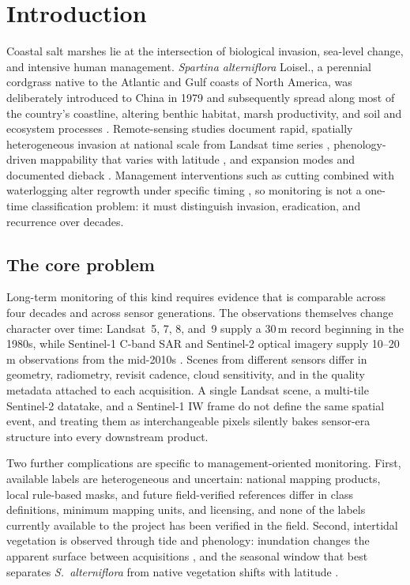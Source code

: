 \section{Introduction}\label{sec:intro}

Coastal salt marshes lie at the intersection of biological invasion,
sea-level change, and intensive human management. \emph{Spartina
alterniflora} Loisel., a perennial cordgrass native to the Atlantic and
Gulf coasts of North America, was deliberately introduced to China in
1979 and subsequently spread along most of the country's coastline,
altering benthic habitat, marsh productivity, and soil and ecosystem
processes
\citep{wang2018soilcarbon,zheng2018productivity,wang2010benthic}. Remote-sensing studies
document rapid, spatially heterogeneous invasion at national scale from
Landsat time series \citep{liu2018rapid,mao2019rapid}, phenology-driven
mappability that varies with latitude \citep{zhang2022latitudinal}, and
expansion modes and documented dieback
\citep{yan2023monitoring}. Management interventions such as cutting
combined with waterlogging alter regrowth under specific timing
\citep{yuan2011cutting}, so monitoring is not a one-time classification
problem: it must distinguish invasion, eradication, and recurrence over
decades.

\subsection{The core problem}
Long-term monitoring of this kind requires evidence that is comparable
across four decades and across sensor generations. The observations
themselves change character over time: Landsat~5, 7, 8, and~9 supply a
30\,m record beginning in the 1980s, while Sentinel-1 C-band SAR and
Sentinel-2 optical imagery supply 10--20\,m observations from the
mid-2010s \citep{wulder2012archive,torres2012s1,drusch2012s2}. Scenes
from different sensors differ in geometry, radiometry, revisit
cadence, cloud sensitivity, and in the quality metadata attached to
each acquisition. A single Landsat scene, a multi-tile Sentinel-2
datatake, and a Sentinel-1 IW frame do not define the same spatial
event, and treating them as interchangeable pixels silently bakes
sensor-era structure into every downstream product.

Two further complications are specific to management-oriented
monitoring. First, available labels are heterogeneous and uncertain:
national mapping products, local rule-based masks, and future
field-verified references differ in class definitions, minimum mapping
units, and licensing, and none of the labels currently available to the
project has been verified in the field. Second, intertidal vegetation
is observed through tide and phenology: inundation changes the apparent
surface between acquisitions \citep{oconnell2017tmii}, and the seasonal
window that best separates \emph{S.~alterniflora} from native
vegetation shifts with latitude \citep{zhang2022latitudinal}.

